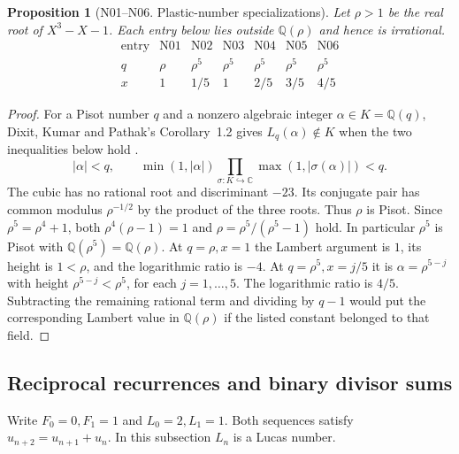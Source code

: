 \documentclass[11pt,a4paper]{article}
\newtheorem{proposition}[theorem]{Proposition}
\theoremstyle{definition}
\theoremstyle{remark}
\begin{document}
\par\hypertarget{cat-N01}{}\label{page:N01}\hypertarget{cat-N02}{}\label{page:N02}\hypertarget{cat-N03}{}\label{page:N03}\hypertarget{cat-N04}{}\label{page:N04}\hypertarget{cat-N05}{}\label{page:N05}\hypertarget{cat-N06}{}\label{page:N06}
\begin{proposition}[N01--N06. Plastic-number specializations]
Let $\rho>1$ be the real root of $X^3-X-1$. Each entry below lies outside
$\mathbb Q(\rho)$ and hence is irrational.
\[
\begin{array}{c|rrrrrr}
\text{entry}&\mathrm{N01}&\mathrm{N02}&\mathrm{N03}&\mathrm{N04}&\mathrm{N05}&\mathrm{N06}\\
q&\rho&\rho^5&\rho^5&\rho^5&\rho^5&\rho^5\\
x&1&1/5&1&2/5&3/5&4/5
\end{array}
\]
\end{proposition}
\begin{proof}
For a Pisot number $q$ and a nonzero algebraic integer $\alpha\in K=\mathbb Q(q)$,
Dixit, Kumar and Pathak's Corollary~1.2 gives $L_q(\alpha)\notin K$
when the two inequalities below hold \cite{nDKP}.
\[
 |\alpha|<q,\qquad\min(1,|\alpha|)\prod_{\sigma:K\hookrightarrow\mathbb C}
\max(1,|\sigma(\alpha)|)<q.
\]
The cubic has no rational root and discriminant $-23$. Its conjugate pair
has common modulus $\rho^{-1/2}$ by the product of the three roots.
Thus $\rho$ is Pisot. Since $\rho^5=\rho^4+1$, both
$\rho^4(\rho-1)=1$ and $\rho=\rho^5/(\rho^5-1)$ hold. In particular
$\rho^5$ is Pisot with $\mathbb Q(\rho^5)=\mathbb Q(\rho)$.
At $q=\rho,x=1$ the Lambert argument is $1$, its height is $1<\rho$,
and the logarithmic ratio is $-4$. At $q=\rho^5,x=j/5$ it is
$\alpha=\rho^{5-j}$ with height $\rho^{5-j}<\rho^5$, for each
$j=1,\ldots,5$. The logarithmic ratio is $4/5$. Subtracting the
remaining rational term and dividing by $q-1$ would put the
corresponding Lambert value in $\mathbb Q(\rho)$ if the listed constant
belonged to that field.
\end{proof}

\subsection{Reciprocal recurrences and binary divisor sums}
Write $F_0=0,F_1=1$ and $L_0=2,L_1=1$. Both sequences satisfy
$u_{n+2}=u_{n+1}+u_n$. In this subsection $L_n$ is a Lucas number.
\end{document}

